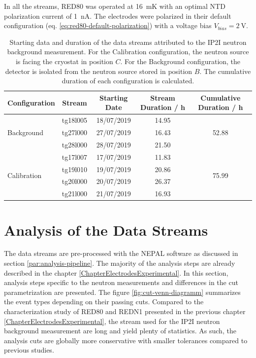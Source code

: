 In all the streams, RED80 was operated at \SI{16}{\milli\kelvin} with an optimal NTD polarization current of \SI{1}{\nano\ampere}. The electrodes were polarized in their default configuration (eq. \ref{eq:red80-default-polarization}) with a voltage bias $V_{bias} = \SI{2}{\volt}$.

\begin{table}[]
\centering
\begin{tabular}{l|c|c|c|c}
Configuration                & Stream   & Starting Date & Stream Duration / \si{ \hour} & Cumulative Duration / \si{ \hour}  \\ \hline \hline
\multirow{3}{*}{Background}  & tg18l005 & 18/07/2019  & 14.95 & \multirow{3}{*}{52.88}\\
                             & tg27l000 & 27/07/2019 & 16.43 & \\
                             & tg28l000 & 28/07/2019 & 21.50 & \\ \hline
\multirow{4}{*}{Calibration} & tg17l007 & 17/07/2019 & 11.83 & \multirow{4}{*}{75.99} \\
                             & tg19l010 & 19/07/2019 & 20.86 &\\
                             & tg20l000 & 20/07/2019 & 26.37  & \\
                             & tg21l000 & 21/07/2019 & 16.93  &
\end{tabular}
\caption{Starting data and duration of the data streams attributed to the IP2I neutron background measurement. For the Calibration configuration, the neutron source is facing the cryostat in position $C$. For the Background configuration, the detector is isolated from the neutron source stored in position $B$. The cumulative duration of each configuration is calculated.}
\label{tab:neutron-streams}
\end{table}


\section{Analysis of the Data Streams}
\label{par:analysis-data-streams}

The data streams are pre-processed with the NEPAL software as discussed in section \ref{par:analysis-pipeline}. The majority of the analysis steps are already described in the chapter \ref{ChapterElectrodesExperimental}. 
In this section, analysis steps specific to the neutron measurements and differences in the cut parametrization are presented. The figure \ref{fig:cut-venn-diagramm} summarizes the event types depending on their passing cuts.
Compared to the characterization study of RED80 and REDN1 presented in the previous chapter \ref{ChapterElectrodesExperimental}, the stream used for the IP2I neutron background measurement are long and yield plenty of statistics. As such, the analysis cuts are globally more conservative with smaller tolerances compared to previous studies. 

